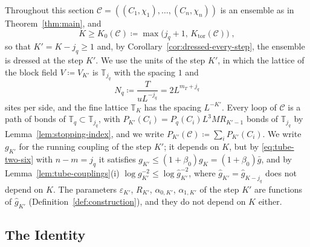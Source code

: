 \documentclass[11pt]{preprint}
\numberwithin{equation}{section}
\theoremstyle{definition}
\theoremstyle{remark}
\theoremstyle{plain}
\begin{document}
Throughout this section $\mathcal C = ((C_1, \chi_1), \dots, (C_n, \chi_n))$ is an ensemble as in Theorem~\ref{thm:main}, and
\begin{equation}\label{eq:index-k-zero}
    K \geq K_0(\mathcal C) \coloneqq \max\bigl(j_q + 1,\, K_{\mathrm{tor}}(\mathcal C)\bigr)\;,
\end{equation}
so that $K' = K - j_q \geq 1$ and, by Corollary~\ref{cor:dressed-every-step}, the ensemble is dressed at the step $K'$. We use the units of the step $K'$, in which the lattice of the block field $V \coloneqq V_{K'}$ is $\mathbb T_{j_q}$ with the spacing $1$ and
\begin{equation}\label{eq:stopping-sites}
    N_q \coloneqq \frac{T}{uL^{-j_q}} = 2L^{m_T + j_q}
\end{equation}
sites per side, and the fine lattice $\mathbb T_K$ has the spacing $L^{-K'}$. Every loop of $\mathcal C$ is a path of bonds of $\mathbb T_q \subset \mathbb T_{j_q}$, with $P_{K'}(C_i) = P_q(C_i)L^3MR_{K'-1}$ bonds of $\mathbb T_{j_q}$ by Lemma~\ref{lem:stopping-index}, and we write $P_{K'}(\mathcal C) \coloneqq \sum_iP_{K'}(C_i)$. We write $g_{K'}$ for the running coupling of the step $K'$; it depends on $K$, but by \eqref{eq:tube-two-six} with $n - m = j_q$ it satisfies $g_{K'} \leq (1 + \beta_0)g_K = (1 + \beta_0)\bar g$, and by Lemma~\ref{lem:tube-couplings}(i) $\log g_{K'}^{-2} \leq \log\hat g_{K'}^{-2}$, where $\hat g_{K'} = \hat g_{K-j_q}$ does not depend on $K$. The parameters $\varepsilon_{K'}$, $R_{K'}$, $\alpha_{0,K'}$, $\alpha_{1,K'}$ of the step $K'$ are functions of $\hat g_{K'}$ (Definition~\ref{def:construction}), and they do not depend on $K$ either.

\subsection{The Identity}\label{sec:identity}
\end{document}
